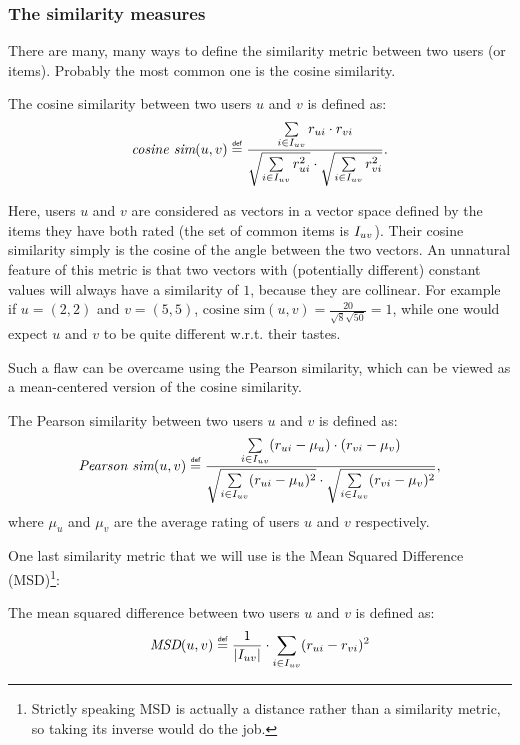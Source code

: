 \subsubsection{The similarity measures}
\label{SEC:similarity_measures}

There are many, many ways to define the similarity metric between two users (or
items).
Probably the most common one is the cosine similarity.

\begin{definition}
  The cosine similarity between two users $u$ and $v$ is defined as:
$$
\emph{cosine sim}(u, v) \eqdef \frac{ \sum\limits_{i \in \Iuv} \rui \cdot \rvi}
{\sqrt{\sum\limits_{i \in \Iuv} \rui^2} \cdot \sqrt{\sum\limits_{i \in \Iuv}
\rvi^2}}.
$$
\end{definition}

Here, users $u$ and $v$ are considered as vectors in a vector space defined by
the items they have both rated (the set of common items is $I_{uv}$). Their
cosine similarity simply is the cosine of the angle between the two vectors. An
unnatural feature of this metric is that two vectors with (potentially
different) constant values will always have a similarity of $1$, because they
are collinear. For example if $u = (2, 2)$ and $v = (5, 5)$, $\text{cosine
sim}(u, v) = \frac{20}{\sqrt{8}\sqrt{50}} = 1$, while one would expect $u$ and
$v$ to be quite different w.r.t. their tastes.

Such a flaw can be overcame using the Pearson similarity, which can be viewed as
a mean-centered version of the cosine similarity.

\begin{definition}
  The Pearson similarity between two users $u$ and $v$ is defined as:
$$
\emph{Pearson sim}(u, v) \eqdef \frac{ \sum\limits_{i \in \Iuv}
(\rui -  \mu_u) \cdot (\rvi - \mu_{v})} {\sqrt{\sum\limits_{i
\in \Iuv} (\rui -  \mu_u)^2} \cdot \sqrt{\sum\limits_{i \in
\Iuv} (\rvi -  \mu_{v})^2}},
$$
where $\mu_u$ and $\mu_v$ are the average rating of users $u$ and $v$
respectively.
\end{definition}

One last similarity metric that we will use is the Mean Squared Difference
(MSD)\footnote{Strictly speaking MSD is actually a distance rather than a
similarity metric, so taking its inverse would do the job.}:
\begin{definition}
  The mean squared difference between two users $u$ and $v$ is defined as:
$$\emph{MSD}(u, v) \eqdef \frac{1}{|\Iuv|} \cdot \sum\limits_{i \in \Iuv} (\rui
- \rvi)^2$$
\end{definition}

